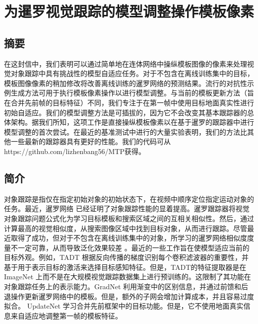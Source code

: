 \chapter{为暹罗视觉跟踪的模型调整操作模板像素}\label{chap:MTP}

\section{摘要}
在这封信中，我们表明可以通过简单地在连体网络中操纵模板图像的像素来处理视觉对象跟踪中具有挑战性的模型自适应任务。对于不包含在离线训练集中的目标，模板图像像素的稍加修改将改善离线训练的暹罗网络的预测结果。流行的对抗性示例生成方法可用于执行模板像素操作以进行模型调整。与当前的模板更新方法（旨在合并先前帧的目标特征）不同，我们专注于在第一帧中使用目标地面真实性进行初始自适应。我们的模型调整方法是可插拔的，因为它不会改变其基本跟踪器的总体架构。据我们所知，这项工作是直接操纵模板像素以在基于暹罗的跟踪器中进行模型调整的首次尝试。在最近的基准测试中进行的大量实验表明，我们的方法比其他一些最新的跟踪器具有更好的性能。我们的代码可从https://github.com/lizhenbang56/MTP获得。

\section{简介}
对象跟踪是指仅在指定初始对象的初始状态下，在视频中顺序定位指定运动对象的任务。最近，暹罗网络 \cite{danelljan2019atom, SiamFC} 已经证明了对象跟踪性能的显着提高。暹罗跟踪器将视觉对象跟踪问题公式化为学习目标模板和搜索区域之间的互相关相似性。然后，通过计算最高的视觉相似度，从搜索图像区域中找到目标对象，从而进行跟踪。尽管最近取得了成功，但对于不包含在离线训练集中的对象，所学习的暹罗网络相似度度量不一定可靠，从而导致泛化效果较差 \cite{Bhat_2019_ICCV}。最近的一些工作旨在使模型适应当前的目标外观。例如，TADT \cite{Li_2019_CVPR} 根据反向传播的梯度识别每个卷积滤波器的重要性，并基于用于表示目标的激活来选择目标感知特征。但是，TADT的特征提取器是在ImageNet \cite{VID}上而不是在大规模视觉跟踪数据集上进行预训练的。这限制了其功能在对象跟踪任务上的表示能力。GradNet \cite{Li_2019_ICCV} 利用渐变中的区别信息，并通过前馈和后退操作更新暹罗网络中的模板。但是，额外的子网会增加计算成本，并且容易过度拟合。 UpdateNet \cite{Zhang_2019_ICCV} 学习合并先前框架中的目标功能。但是，它不使用地面真实信息来自适应地调整第一帧的模板特征。

